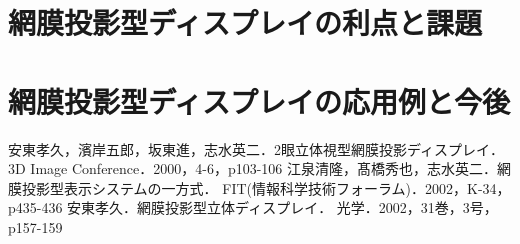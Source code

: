 \documentclass[dvipdfmx]{ujarticle}
\begin{document}
\section{網膜投影型ディスプレイの利点と課題}

\section{網膜投影型ディスプレイの応用例と今後}

\begin{thebibliography}{99}
     安東孝久，濱岸五郎，坂東進，志水英二．2眼立体視型網膜投影ディスプレイ．
        3D Image Conference．2000，4-6，p103-106
     江泉清隆，髙橋秀也，志水英二．網膜投影型表示システムの一方式．
        FIT(情報科学技術フォーラム)．2002，K-34，p435-436
     安東孝久．網膜投影型立体ディスプレイ．
        光学．2002，31巻，3号，p157-159
\end{thebibliography}

\end{document}
